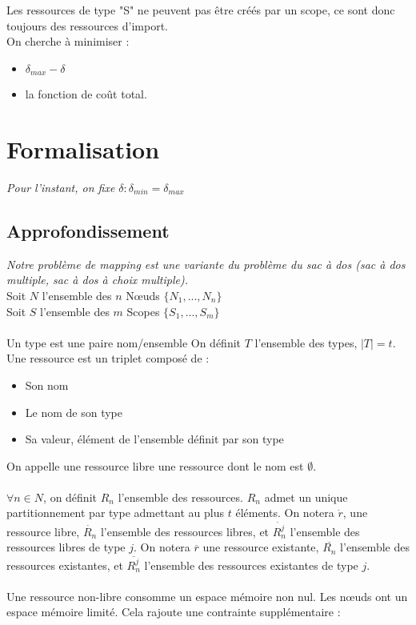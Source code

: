\documentclass[11pt,a4paper]{article} %
\begin{document}
Les ressources de type "S" ne peuvent pas être créés par un scope, ce sont donc toujours des ressources d'import.\\
On cherche à minimiser : \begin{itemize}
\item $\delta_{max} - \delta$
\item la fonction de coût total.
\end{itemize}

\section{Formalisation}
\textit{Pour l'instant, on fixe $\delta: \delta_{min} = \delta_{max}$}
\subsection{Approfondissement}
\textit{Notre problème de mapping est une variante du problème du sac à dos (sac à dos multiple, sac à dos à choix multiple).}\\
Soit $N$ l'ensemble des $n$ Nœuds $\{N_1,...,N_n\}$\\
Soit $S$ l'ensemble des $m$ Scopes $\{S_1,...,S_m\}$\\\\
Un type est une paire nom/ensemble
On définit $T$ l'ensemble des types, $|T|=t$.\\
Une ressource est un triplet composé de :
\begin{itemize}
\item Son nom
\item Le nom de son type
\item Sa valeur, élément de l'ensemble définit par son type
\end{itemize}
On appelle une ressource libre une ressource dont le nom est $\emptyset$.\\\\
$\forall n \in N$, on définit $R_n$ l'ensemble des ressources. $R_n$ admet un unique partitionnement par type admettant au plus $t$ éléments. On notera $\dot{r}$, une ressource libre, $\dot{R_n}$ l'ensemble des ressources libres, et $\dot{R_n^j}$ l'ensemble des ressources libres de type $j$. On notera $\overline{r}$ une ressource existante, $\overline{R_n}$ l'ensemble des ressources existantes, et $\overline{R_n^j}$ l'ensemble des ressources existantes de type $j$.\\\\
Une ressource non-libre consomme un espace mémoire non nul. Les nœuds ont un espace mémoire limité. Cela rajoute une contrainte supplémentaire :
\end{document}
